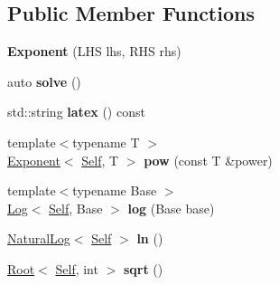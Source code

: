 \subsection*{Public Member Functions}
\begin{DoxyCompactItemize}
\item 
\hypertarget{classlatex_1_1math_1_1Exponent_aa5aed1982f782807e28d89ee55e80b6c}{{\bfseries Exponent} (L\-H\-S lhs, R\-H\-S rhs)}\label{classlatex_1_1math_1_1Exponent_aa5aed1982f782807e28d89ee55e80b6c}

\item 
\hypertarget{classlatex_1_1math_1_1Exponent_a8439ad349c0eccc952ef103f08d2bfa9}{auto {\bfseries solve} ()}\label{classlatex_1_1math_1_1Exponent_a8439ad349c0eccc952ef103f08d2bfa9}

\item 
\hypertarget{classlatex_1_1math_1_1Exponent_a8574c4b6b5e978c26b3aec20a8ecddaa}{std\-::string {\bfseries latex} () const }\label{classlatex_1_1math_1_1Exponent_a8574c4b6b5e978c26b3aec20a8ecddaa}

\item 
\hypertarget{classlatex_1_1math_1_1Exponent_a3356a953247f72211236fc7348a96eee}{{\footnotesize template$<$typename T $>$ }\\\hyperlink{classlatex_1_1math_1_1Exponent}{Exponent}$<$ \hyperlink{classlatex_1_1math_1_1Exponent}{Self}, T $>$ {\bfseries pow} (const T \&power)}\label{classlatex_1_1math_1_1Exponent_a3356a953247f72211236fc7348a96eee}

\item 
\hypertarget{classlatex_1_1math_1_1Exponent_a9ab50d8d1eec6941094ad43be822ebc9}{{\footnotesize template$<$typename Base $>$ }\\\hyperlink{classlatex_1_1math_1_1Log}{Log}$<$ \hyperlink{classlatex_1_1math_1_1Exponent}{Self}, Base $>$ {\bfseries log} (Base base)}\label{classlatex_1_1math_1_1Exponent_a9ab50d8d1eec6941094ad43be822ebc9}

\item 
\hypertarget{classlatex_1_1math_1_1Exponent_afcc8f289108fa9e56aeb149698f3eeb3}{\hyperlink{classlatex_1_1math_1_1NaturalLog}{Natural\-Log}$<$ \hyperlink{classlatex_1_1math_1_1Exponent}{Self} $>$ {\bfseries ln} ()}\label{classlatex_1_1math_1_1Exponent_afcc8f289108fa9e56aeb149698f3eeb3}

\item 
\hypertarget{classlatex_1_1math_1_1Exponent_acd5ba5b5920f79e1b1a7332c3f248121}{\hyperlink{classlatex_1_1math_1_1Root}{Root}$<$ \hyperlink{classlatex_1_1math_1_1Exponent}{Self}, int $>$ {\bfseries sqrt} ()}\label{classlatex_1_1math_1_1Exponent_acd5ba5b5920f79e1b1a7332c3f248121}

\end{DoxyCompactItemize}
